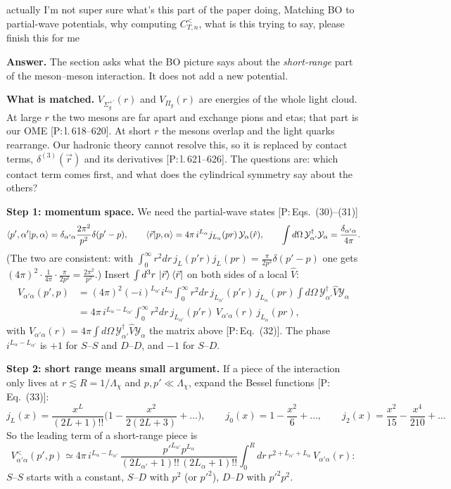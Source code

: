 \documentclass[11pt,a4paper]{article}
\newcommand{\tagP}[1]{\textcolor{blue!65!black}{\textsf{\small[P:\,#1]}}}
\newenvironment{aiadd}{\par}{\par}
\begin{document}
actually I'm not super sure what's this part of the paper doing, Matching BO to partial-wave potentials, why computing $C_{T,n}^<$, what is this trying to say, please finish this for me

\begin{aiadd}
	\textbf{Answer.} The section asks what the BO picture says about the \emph{short-range} part of the meson--meson interaction. It does not add a new potential.

	\textbf{What is matched.} $V_{\Sigma_g^{+\prime}}(r)$ and $V_{\Pi_g}(r)$ are energies of the whole light cloud. At large $r$ the two mesons are far apart and exchange pions and etas; that part is our OME \tagP{l.\,618--620}. At short $r$ the mesons overlap and the light quarks rearrange. Our hadronic theory cannot resolve this, so it is replaced by contact terms, $\delta^{(3)}(\vec r)$ and its derivatives \tagP{l.\,621--626}. The questions are: which contact term comes first, and what does the cylindrical symmetry say about the others?

	\textbf{Step 1: momentum space.} We need the partial-wave states \tagP{Eqs.~(30)--(31)}
	\[
		\braket{p',\alpha'|p,\alpha}=\delta_{\alpha'\alpha}\frac{2\pi^2}{p^2}\delta(p'-p),\qquad
		\braket{\vec r|p,\alpha}=4\pi\,i^{L_\alpha}j_{L_\alpha}(pr)\,\mathcal Y_\alpha(\hat r),\qquad
		\int d\Omega\,\mathcal Y_{\alpha'}^\dagger\mathcal Y_\alpha=\frac{\delta_{\alpha'\alpha}}{4\pi}.
	\]
	(The two are consistent: with $\int_0^\infty r^2dr\,j_L(p'r)j_L(pr)=\frac{\pi}{2p^2}\delta(p'-p)$ one gets $(4\pi)^2\cdot\frac{1}{4\pi}\cdot\frac{\pi}{2p^2}=\frac{2\pi^2}{p^2}$.) Insert $\int d^3r\,\ket{\vec r}\bra{\vec r}$ on both sides of a local $\hat V$:
	\begin{align*}
		V_{\alpha'\alpha}(p',p) & =(4\pi)^2(-i)^{L_{\alpha'}}i^{L_\alpha}\int_0^\infty r^2dr\,j_{L_{\alpha'}}(p'r)\,j_{L_\alpha}(pr)\int d\Omega\,\mathcal Y_{\alpha'}^\dagger\hat V\mathcal Y_\alpha \\
		                        & =4\pi\,i^{L_\alpha-L_{\alpha'}}\int_0^\infty r^2dr\,j_{L_{\alpha'}}(p'r)\,V_{\alpha'\alpha}(r)\,j_{L_\alpha}(pr),
	\end{align*}
	with $V_{\alpha'\alpha}(r)=4\pi\int d\Omega\,\mathcal Y_{\alpha'}^\dagger\hat V\mathcal Y_\alpha$ the matrix above \tagP{Eq.~(32)}. The phase $i^{L_\alpha-L_{\alpha'}}$ is $+1$ for $S$--$S$ and $D$--$D$, and $-1$ for $S$--$D$.

	\textbf{Step 2: short range means small argument.} If a piece of the interaction only lives at $r\lesssim R=1/\Lambda_\chi$ and $p,p'\ll\Lambda_\chi$, expand the Bessel functions \tagP{Eq.~(33)}:
	\[
		j_L(x)=\frac{x^L}{(2L+1)!!}\Big(1-\frac{x^2}{2(2L+3)}+\dots\Big),\qquad
		j_0(x)=1-\frac{x^2}{6}+\dots,\qquad
		j_2(x)=\frac{x^2}{15}-\frac{x^4}{210}+\dots
	\]
	So the leading term of a short-range piece is
	\[
		V^<_{\alpha'\alpha}(p',p)\simeq4\pi\,i^{L_\alpha-L_{\alpha'}}\,\frac{p'^{L_{\alpha'}}p^{L_\alpha}}{(2L_{\alpha'}+1)!!\,(2L_\alpha+1)!!}\int_0^Rdr\,r^{2+L_{\alpha'}+L_\alpha}\,V_{\alpha'\alpha}(r):
	\]
	$S$--$S$ starts with a constant, $S$--$D$ with $p^2$ (or $p'^2$), $D$--$D$ with $p'^2p^2$.


\end{aiadd}
\end{document}
